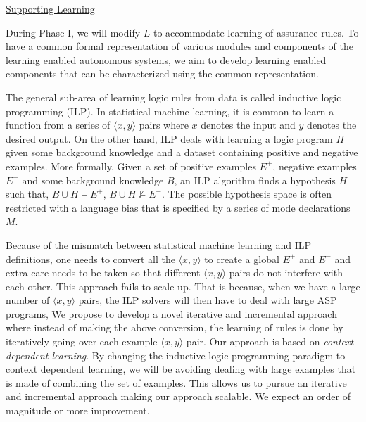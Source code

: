 \noindent\underline{Supporting Learning}

During Phase I, we will modify $L$ to accommodate learning of assurance rules.  To have a common formal representation of various modules and components of the learning enabled autonomous systems, we aim to develop learning enabled components that can be characterized using the common representation. 

The general sub-area of learning logic rules from data is called inductive logic programming (ILP). 
In statistical machine learning, it is common to learn a function from a series of $\langle x, y \rangle$ pairs where $x$ denotes the input and $y$ denotes the desired output. On the other hand, ILP deals with learning a logic program $H$ given some background knowledge and a dataset containing positive and negative examples. More formally, Given a set of positive examples $E^{+}$, negative examples $E^{−}$ and some background knowledge $B$, an ILP algorithm \cite{muggleton1991inductive} finds a hypothesis $H$ such that, $B \cup H  \models E^{+}$, $B \cup H \not \models E^{−}$. The possible hypothesis space is often restricted with a language bias that is specified by a series of mode declarations $M$.

Because of the mismatch between statistical machine learning and ILP definitions, one needs to convert all the $\langle x,y \rangle$ to create a global $E^{+}$ and $E^{−}$ and extra care needs to be taken so that different $\langle x,y \rangle$   pairs do not interfere with each other.  This approach fails to scale up. That is because, when we have a large  number of $\langle x,y \rangle$  pairs, the ILP solvers will then have to deal with large ASP programs,  We propose to develop a novel iterative and incremental approach where instead of making the above conversion, the learning of rules is done by iteratively going over each example $\langle x,y \rangle$ pair.   Our approach is based on {\em context dependent learning}. By changing the inductive logic programming paradigm to context dependent learning, we will be avoiding dealing with large examples that is made of combining the set of examples. This allows us to pursue an iterative and incremental approach making our approach scalable.  We expect an order of magnitude or more improvement. 


